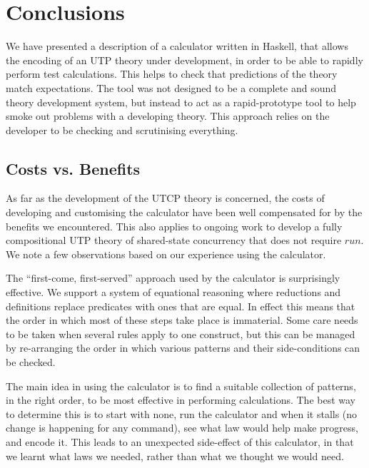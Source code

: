 \section{Conclusions}\label{sec:Conc}

We have presented a description of a calculator written in Haskell,
that allows the encoding of an UTP theory under development,
in order to be able to rapidly perform test calculations.
This helps to check that predictions of the theory match expectations.
The tool was not designed to be a complete and sound theory development
system,
but instead to act as a rapid-prototype tool to help smoke out problems
with a developing theory. This approach relies on the  developer
to be checking and scrutinising everything.

\subsection{Costs vs. Benefits}

As far as the development of the UTCP theory is concerned,
the costs of developing and customising the calculator
have been well compensated for by the benefits we encountered.
This also applies to ongoing work to develop a fully compositional UTP theory
of shared-state concurrency that does not require $run$.
We note a few observations based on our experience
using the calculator.


   The ``first-come, first-served'' approach
   used by the calculator is surprisingly effective.
   We support a system of equational reasoning
   where reductions and definitions replace predicates with ones that
   are equal.
   In effect this means that the order in which most of these steps
   take place is immaterial.
   Some care needs to be taken when several rules apply to one construct,
   but this can be managed by re-arranging the order in which various
   patterns and their side-conditions can be checked.


   The main idea in using the calculator
   is to find a suitable collection of patterns,
   in the right order,
   to be most effective in performing calculations.
   The best way to determine this is to start with none,
   run the calculator and when it stalls
   (no change is happening for any command),
   see what law would help make progress, and encode it.
   This leads to an unexpected side-effect of this calculator,
   in that we learnt what laws we needed,
   rather than what we thought we would need.




